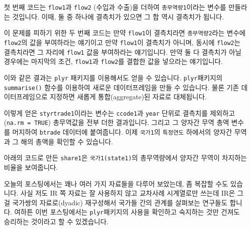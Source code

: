 \documentclass[]{book}
\newenvironment{Shaded}{\begin{snugshade}}{\end{snugshade}}
\newcommand{\DataTypeTok}[1]{\textcolor[rgb]{0.13,0.29,0.53}{#1}}
\newcommand{\KeywordTok}[1]{\textcolor[rgb]{0.13,0.29,0.53}{\textbf{#1}}}
\newcommand{\NormalTok}[1]{#1}
\newcommand{\OperatorTok}[1]{\textcolor[rgb]{0.81,0.36,0.00}{\textbf{#1}}}
\newcommand{\OtherTok}[1]{\textcolor[rgb]{0.56,0.35,0.01}{#1}}
\newcommand{\StringTok}[1]{\textcolor[rgb]{0.31,0.60,0.02}{#1}}
\begin{document}
첫 번째 코드는 \texttt{flow1}과 \texttt{flow2} (수입과 수출)을 더하여 \texttt{총무역량1}이라는 변수를 만들라는 것입니다. 이때, 둘 중 하나에 결측치가 있으면 그 합 역시 결측치가 됩니다.

이 문제를 피하기 위한 두 번째 코드는 만약 \texttt{flow1}이 결측치라면 \texttt{총무역량2}라는 변수에 \texttt{flow2}의 값을 부여하라는 얘기이고 만약 \texttt{flow1}이 결측치가 아니며, 동시에 \texttt{flow2}는 결측치라면 그 자리에 \texttt{flow1} 값을 부여하라는 얘기입니다. 만약 둘 다 결측치가 아닐 경우에는 마지막의 조건, \texttt{flow1}과 \texttt{flow2}를 결합한 값을 넣으라는 얘기입니다.

이와 같은 결과는 \texttt{plyr} 패키지를 이용해서도 얻을 수 있습니다. \texttt{plyr}패키지의 \texttt{summarise()} 함수를 이용하여 새로운 데이터프레임을 만들 수 있습니다. 물론 기존 데이터프레임으로 지정하면 새롭게 통합(aggregate)된 자료로 대체됩니다.

이렇게 얻은 \texttt{styrtrade1}이라는 변수는 \texttt{ccode1}과 \texttt{year} 단위로 결측치를 제외하고(\texttt{na.rm\ =\ TRUE}) 총무역값을 전부 더한 결과입니다. 그리고 그 양자간 무역 총액 변수를 머지하여 \texttt{btrade} 데이터에 붙여줍니다. 이제 \texttt{국가1}의 \texttt{특정연도} 하에서의 양자간 무역과 그 해의 총액을 확인할 수 있습니다.

아래의 코드로 만든 \texttt{share1}은 \texttt{국가1(state1)}의 총무역량에서 양자간 무역이 차지하는 비율을 보여줍니다.

\begin{Shaded}
\end{Shaded}

오늘의 포스팅에서는 꽤나 여러 가지 자료들을 다루어 보았는데, 좀 복잡할 수도 있습니다. 사실 저도 IR 쪽 자료는 잘 사용하지 않고 교차사례 시계열로만 쓰는데 IR은 그걸 국가쌍의 자료로(dyadic) 재구성해서 국가들 간의 관계를 살펴보는 연구들도 합니다. 여하튼 이번 포스팅에서는 \texttt{plyr}패키지의 사용을 확인하고 숙지하는 것만 건져도 승리하는 것이라고 할 수 있겠습니다.
\end{document}
